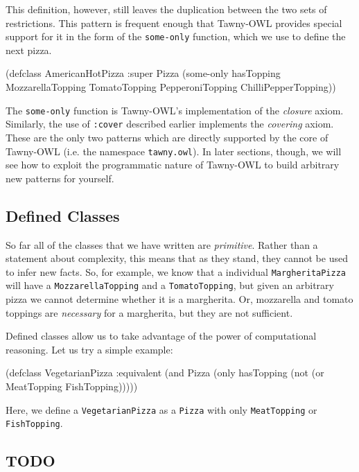 \documentclass[11pt]{article}
\begin{document}
This definition, however, still leaves the duplication between the two sets of
restrictions. This pattern is frequent enough that Tawny-OWL provides special
support for it in the form of the \verb~some-only~ function, which we use to define
the next pizza.

\begin{tawny}
(defclass AmericanHotPizza
  :super
  Pizza
  (some-only hasTopping MozzarellaTopping TomatoTopping
	     PepperoniTopping ChilliPepperTopping))
\end{tawny}

The \verb~some-only~ function is Tawny-OWL's implementation of the \emph{closure} axiom.
Similarly, the use of \verb~:cover~ described earlier implements the \emph{covering}
axiom. These are the only two patterns which are directly supported by the
core of Tawny-OWL (i.e. the namespace \verb~tawny.owl~). In later sections, though,
we will see how to exploit the programmatic nature of Tawny-OWL to build
arbitrary new patterns for yourself.


\subsection{Defined Classes}
\label{sec-5-7}
\label{defined}

So far all of the classes that we have written are \emph{primitive}. Rather than a
statement about complexity, this means that as they stand, they cannot be used
to infer new facts. So, for example, we know that a individual
\verb~MargheritaPizza~ will have a \verb~MozzarellaTopping~ and a \verb~TomatoTopping~, but
given an arbitrary pizza we cannot determine whether it is a margherita. Or,
mozzarella and tomato toppings are \emph{necessary} for a margherita, but they are
not sufficient.

Defined classes allow us to take advantage of the power of computational
reasoning. Let us try a simple example:

\begin{tawny}
(defclass VegetarianPizza
  :equivalent
  (and Pizza
       (only hasTopping
	     (not (or MeatTopping FishTopping)))))
\end{tawny}

Here, we define a \verb~VegetarianPizza~ as a \verb~Pizza~ with only \verb~MeatTopping~ or
\verb~FishTopping~.


\subsection{{\bfseries\sffamily TODO} }
\label{sec-5-8}
\end{document}
